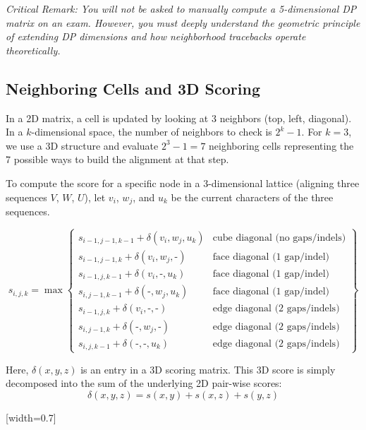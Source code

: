 \sta \textit{Critical Remark: You will not be asked to manually compute a 5-dimensional DP matrix on an exam. However, you must deeply understand the geometric principle of extending DP dimensions and how neighborhood tracebacks operate theoretically.}

\subsection{Neighboring Cells and 3D Scoring}

In a 2D matrix, a cell is updated by looking at 3 neighbors (top, left, diagonal). 
In a $k$-dimensional space, the number of neighbors to check is $2^k - 1$. For $k=3$, we use a 3D structure and evaluate $2^3 - 1 = 7$ neighboring cells representing the 7 possible ways to build the alignment at that step.

To compute the score for a specific node in a 3-dimensional lattice (aligning three sequences $V$, $W$, $U$), let $v_i$, $w_j$, and $u_k$ be the current characters of the three sequences.

\begin{equation} \label{eq:3d_dp}
s_{i,j,k} = \max \left\{ \begin{array}{ll}
s_{i-1, j-1, k-1} + \delta(v_i, w_j, u_k) & \text{cube diagonal (no gaps/indels)} \\
s_{i-1, j-1, k} + \delta(v_i, w_j, \text{-}) & \text{face diagonal (1 gap/indel)} \\
s_{i-1, j, k-1} + \delta(v_i, \text{-}, u_k) & \text{face diagonal (1 gap/indel)} \\
s_{i, j-1, k-1} + \delta(\text{-}, w_j, u_k) & \text{face diagonal (1 gap/indel)} \\
s_{i-1, j, k} + \delta(v_i, \text{-}, \text{-}) & \text{edge diagonal (2 gaps/indels)} \\
s_{i, j-1, k} + \delta(\text{-}, w_j, \text{-}) & \text{edge diagonal (2 gaps/indels)} \\
s_{i, j, k-1} + \delta(\text{-}, \text{-}, u_k) & \text{edge diagonal (2 gaps/indels)}
\end{array} \right\}
\end{equation}

Here, $\delta(x,y,z)$ is an entry in a 3D scoring matrix. This 3D score is simply decomposed into the sum of the underlying 2D pair-wise scores:
\[
\delta(x,y,z) = s(x,y) + s(x,z) + s(y,z)
\]

[width=0.7\textwidth]

